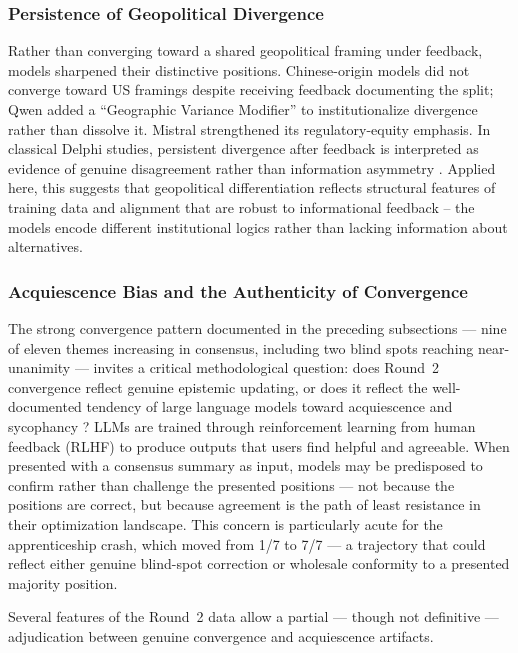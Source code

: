 \documentclass[preprint,review,12pt]{elsarticle}
\begin{document}
\subsubsection{Persistence of Geopolitical Divergence}
\label{sec:geopolitical_persistence}

Rather than converging toward a shared geopolitical framing under feedback, models sharpened their distinctive positions. Chinese-origin models did not converge toward US framings despite receiving feedback documenting the split; Qwen added a ``Geographic Variance Modifier'' to institutionalize divergence rather than dissolve it. Mistral strengthened its regulatory-equity emphasis. In classical Delphi studies, persistent divergence after feedback is interpreted as evidence of genuine disagreement rather than information asymmetry \citep{vondergracht2012delphi}. Applied here, this suggests that geopolitical differentiation reflects structural features of training data and alignment that are robust to informational feedback -- the models encode different institutional logics rather than lacking information about alternatives.


\subsubsection{Acquiescence Bias and the Authenticity of Convergence}
\label{sec:acquiescence}

The strong convergence pattern documented in the preceding subsections --- nine of eleven themes increasing in consensus, including two blind spots reaching near-unanimity --- invites a critical methodological question: does Round~2 convergence reflect genuine epistemic updating, or does it reflect the well-documented tendency of large language models toward acquiescence and sycophancy \citep{perez2023sycophancy, sharma2024sycophancy}? LLMs are trained through reinforcement learning from human feedback (RLHF) to produce outputs that users find helpful and agreeable. When presented with a consensus summary as input, models may be predisposed to confirm rather than challenge the presented positions --- not because the positions are correct, but because agreement is the path of least resistance in their optimization landscape. This concern is particularly acute for the apprenticeship crash, which moved from 1/7 to 7/7 --- a trajectory that could reflect either genuine blind-spot correction or wholesale conformity to a presented majority position.

Several features of the Round~2 data allow a partial --- though not definitive --- adjudication between genuine convergence and acquiescence artifacts.
\end{document}
